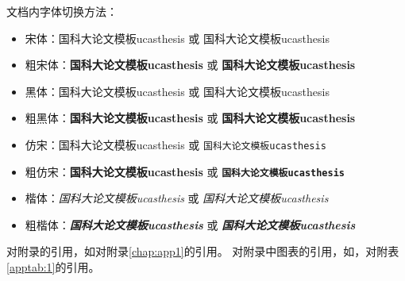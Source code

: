 {文档内字体切换方法：
    \begin{itemize}
        \item 宋体：国科大论文模板ucasthesis 或 \textrm{国科大论文模板ucasthesis}
        \item 粗宋体：{\bfseries 国科大论文模板ucasthesis} 或 \textbf{国科大论文模板ucasthesis}
        \item 黑体：{\sffamily 国科大论文模板ucasthesis} 或 \textsf{国科大论文模板ucasthesis}
        \item 粗黑体：{\bfseries\sffamily 国科大论文模板ucasthesis} 或 \textsf{\bfseries 国科大论文模板ucasthesis}
        \item 仿宋：{\ttfamily 国科大论文模板ucasthesis} 或 \texttt{国科大论文模板ucasthesis}
        \item 粗仿宋：{\bfseries\ttfamily 国科大论文模板ucasthesis} 或 \texttt{\bfseries 国科大论文模板ucasthesis}
        \item 楷体：{\itshape 国科大论文模板ucasthesis} 或 \textit{国科大论文模板ucasthesis}
        \item 粗楷体：{\bfseries\itshape 国科大论文模板ucasthesis} 或 \textit{\bfseries 国科大论文模板ucasthesis}
    \end{itemize}
    
对附录的引用，如对附录\ref{chap:app1}的引用。
对附录中图表的引用，如，对附表\ref{apptab:1}的引用。
\let\cleardoublepage\relax
}
